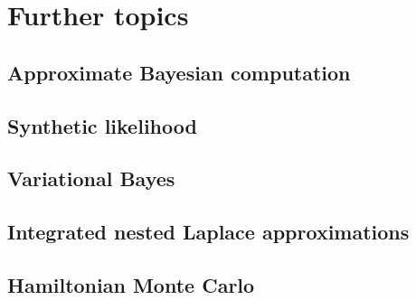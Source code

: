 \chapter{Further topics}\label{chap15}

\section{Approximate Bayesian computation}\label{sec15_1}

\section{Synthetic likelihood}\label{sec15_2}

\section{Variational Bayes}\label{sec15_3}

\section{Integrated nested Laplace approximations}\label{sec15_4}

\section{Hamiltonian Monte Carlo}\label{sec15_5}

